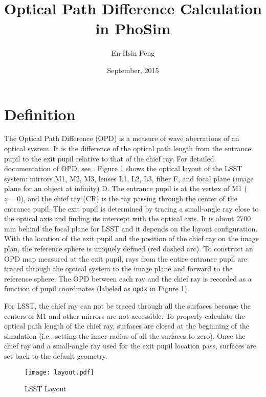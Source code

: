 \documentclass[12pt,twoside]{article}
\begin{document}
\title {{Optical Path Difference Calculation in PhoSim}}
\author{{En-Hsin Peng}}
\date{September, 2015}






\maketitle



\section{Definition}
The Optical Path Difference (OPD) is a measure of wave aberrations of an optical system. It is the difference of the optical path length from the entrance pupil to the exit pupil relative to that of the chief ray. For detailed documentation of OPD, see \cite{opddef}. Figure \ref{fig:layout} shows the optical layout of the LSST system: mirrors M1, M2, M3, lenses L1, L2, L3, filter F, and focal plane (image plane for an object at infinity) D. The entrance pupil is at the vertex of M1 ($z=0$), and the chief ray (CR) is the ray passing through the center of the entrance pupil. The exit pupil is determined by tracing a small-angle ray close to the optical axis and finding its intercept with the optical axis. It is about 2700 mm behind the focal plane for LSST and it depends on the layout configuration. With the location of the exit pupil and the position of the chief ray on the image plan, the reference sphere is uniquely defined (red dashed arc). To construct an OPD map measured at the exit pupil, rays from the entire entrance pupil are traced through the optical system to the image plane and forward to the reference sphere. The OPD between each ray and the chief ray is recorded as a function of pupil coordinates (labeled as \texttt{opdx} in Figure \ref{fig:layout}).

For LSST, the chief ray can not be traced through all the surfaces because the centers of M1 and other mirrors are not accessible. To properly calculate the optical path length of the chief ray, surfaces are closed at the beginning  of the simulation (i.e., setting the inner radius of all the surfaces to zero). Once the chief ray and a small-angle ray used for the exit pupil location pass, surfaces are set back to the default geometry.



\begin{figure}[h!tb]
\begin{center}
\texttt{[image: layout.pdf]}
\end{center}
\caption{LSST Layout}
\label{fig:layout}
\end{figure}
 
\end{document}
